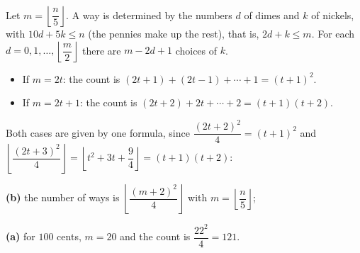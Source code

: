 Let $m=\left\lfloor\dfrac {n}{5}\right\rfloor$. A way is determined by the numbers $d$ of dimes and $k$ of nickels, with $10d+5k\le n$ (the pennies make up the rest), that is, $2d+k\le m$. For each $d=0,1,\dots,\left\lfloor\dfrac {m}{2}\right\rfloor$ there are $m-2d+1$ choices of $k$.
\begin{itemize}
\item If $m=2t$: the count is $(2t+1)+(2t-1)+\cdots+1=(t+1)^2$.
\item If $m=2t+1$: the count is $(2t+2)+2t+\cdots+2=(t+1)(t+2)$.
\end{itemize}
Both cases are given by one formula, since $\dfrac{(2t+2)^2}{4}=(t+1)^2$ and $\left\lfloor\dfrac{(2t+3)^2}{4}\right\rfloor=\left\lfloor t^2+3t+\dfrac{9}{4}\right\rfloor=(t+1)(t+2)$:

\textbf{(b)} the number of ways is $\boxed{\left\lfloor\dfrac{(m+2)^2}{4}\right\rfloor}$ with $m=\left\lfloor\dfrac {n}{5}\right\rfloor$;

\textbf{(a)} for $100$ cents, $m=20$ and the count is $\dfrac{22^2}{4}=\boxed{121}$.
